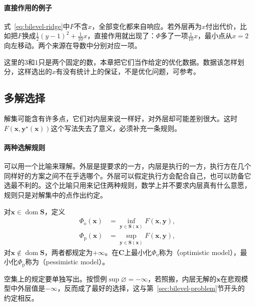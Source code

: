 \paragraph{直接作用的例子}
式~\eqref{eq:bilevel-ridge}中$F$不含$x$，全部变化都来自响应。若外层再为$x$付出代价，比如把$F$换成$\frac12(y-1)^2+\frac{1}{10}x$，直接作用就出现了：$\Phi$多了一项$\frac{1}{10}x$，最小点从$x=2$向左移动。两个来源在导数中分别对应一项。

这里的$3$和$1$只是两个固定的数，本章把它们当作给定的优化数据。数据该怎样划分，这样选出的$x$有没有统计上的保证，不是优化问题，可参考。

\subsection{多解选择}
\label{sec:bilevel-selection}

解集可能含有许多点，它们对内层来说一样好，对外层却可能差别很大。这时$F(\bm{x},\bm{y}^\star(\bm{x}))$这个写法失去了意义，必须补充一条规则。

\paragraph{两种选解规则}
可以用一个比喻来理解。外层是提要求的一方，内层是执行的一方，执行方在几个同样好的方案之间不在乎选哪个。外层可以假定执行方会配合自己，也可以防备它选最不利的。这个比喻只用来记住两种规则，数学上并不要求内层真有什么意愿，规则只是对解集中的点作出约定。

\begin{definition}[乐观模型与悲观模型]
\label{def:bilevel-opt-pes}
对$\bm{x}\in\operatorname{dom}\bm{S}$，定义
\begin{align}
 \Phi_{\mathrm{o}}(\bm{x})&=\inf_{\bm{y}\in\bm{S}(\bm{x})}F(\bm{x},\bm{y}),
 \label{eq:bilevel-optimistic}\\
 \Phi_{\mathrm{p}}(\bm{x})&=\sup_{\bm{y}\in\bm{S}(\bm{x})}F(\bm{x},\bm{y}),
 \label{eq:bilevel-pessimistic}
\end{align}
对$\bm{x}\notin\operatorname{dom}\bm{S}$，两者都规定为$+\infty$。在$\bm{C}$上最小化$\Phi_{\mathrm{o}}$称为（optimistic model），最小化$\Phi_{\mathrm{p}}$称为（pessimistic model）。
\end{definition}

空集上的规定要单独写出。按惯例$\sup\varnothing=-\infty$，若照搬，内层无解的$\bm{x}$在悲观模型中外层值是$-\infty$，反而成了最好的选择，这与第~\ref{sec:bilevel-problem}节开头的约定相反。

